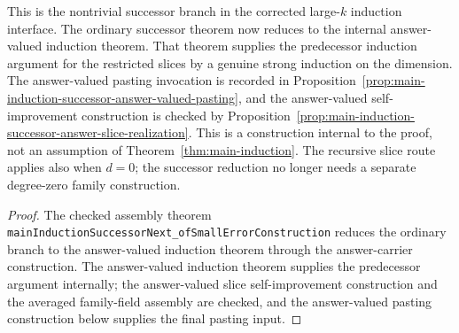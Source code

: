 \begin{proposition}\label{prop:main-induction-successor-small-error-construction}
	\leanok
	This is the nontrivial successor branch in the corrected large-\(k\)
	induction interface.  The ordinary successor theorem now reduces to the
	internal answer-valued induction theorem.  That theorem supplies the
	predecessor induction argument for the restricted slices by a genuine strong
	induction on the dimension.  The answer-valued pasting invocation is recorded
	in Proposition~\ref{prop:main-induction-successor-answer-valued-pasting},
	and the answer-valued self-improvement construction is checked by
	Proposition~\ref{prop:main-induction-successor-answer-slice-realization}.
	This is a construction internal to the proof, not an assumption of
	Theorem~\ref{thm:main-induction}.  The recursive slice route applies also
	when \(d=0\); the successor reduction no longer needs a separate degree-zero
	family construction.
\end{proposition}
\begin{proof}
	\leanok
	The checked assembly theorem
	\texttt{mainInductionSuccessorNext\_ofSmallErrorConstruction} reduces the
	ordinary branch to the answer-valued induction theorem through the
	answer-carrier construction.  The answer-valued induction theorem supplies
	the predecessor argument internally; the answer-valued slice self-improvement
	construction and the averaged family-field assembly are checked, and the
	answer-valued pasting construction below supplies the final pasting input.
\end{proof}


